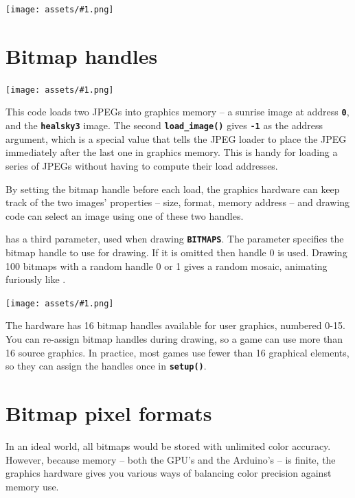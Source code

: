 \documentclass[10pt]{book}
\makeatletter
\newcommand{\png}[1]{
\begin{center}
\texttt{[image: assets/\#1.png]}
\end{center}
}
\newcommand{\mach}[1]{\texttt{\textbf{#1}}}
\newcommand{\cmdidx}[1]{
\index{#1@\mach{#1()}}
}
\newcommand{\dcmd}[1]{\cmdidx{#1}\nameref{#1}}
\makeatother
\begin{document}



\png{0009}
\clearpage

\section{Bitmap handles}
\label{bitmaphandles}

\png{jpeg2}


This code loads two JPEGs into graphics memory -- a sunrise image at address \mach{0}, and the \mach{healsky3} image.
The second \mach{load\_image()} gives \mach{-1} as the address argument, which is a special value that
tells the JPEG loader to place the JPEG immediately after the last one in graphics memory.
This is handy for loading a series of JPEGs without having to compute their load addresses.

By setting the bitmap handle before each load, the graphics hardware can keep track of the two images' properties -- size, format, memory address -- 
and drawing code can select an image using one of these two handles.

\dcmd{Vertex2ii} has a third parameter, used when drawing \mach{BITMAPS}.
The parameter specifies the bitmap handle to use for drawing.
If it is omitted then handle 0 is used.  
Drawing 100 bitmaps with a random handle 0 or 1
gives a random mosaic, animating furiously like .
\png{0010}

The hardware has 16 bitmap handles available for user graphics, numbered 0-15.
You can re-assign bitmap handles during drawing, so a game can use more than 16 source graphics.
In practice, most games use fewer than 16 graphical elements, so they can assign the handles once in \mach{setup()}.

\newpage
\section{Bitmap pixel formats}

In an ideal world, all bitmaps would be stored with unlimited color accuracy.
However, because memory -- both the GPU's and the Arduino's -- is finite,
the graphics hardware gives you various ways of balancing color precision against memory use.

\newcommand{\fmline}[3]{
\index{#1 bitmap format@\mach{#1} bitmap format}
\index{bitmap format!#1@\mach{#1}}
\textbf{\large\mach{#1}} &
#3
& {\raisebox{-96}
            {\texttt{[image: \#2]}}} \\
}
\end{document}
